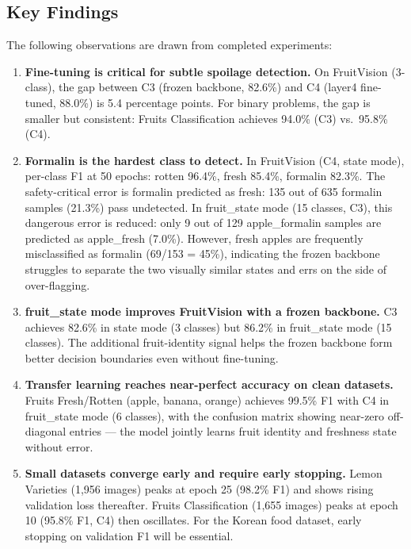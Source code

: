 \documentclass[12pt, a4paper]{article}
\begin{document}
\subsection{Key Findings}

The following observations are drawn from completed experiments:

\begin{enumerate}

\item \textbf{Fine-tuning is critical for subtle spoilage detection.}
On FruitVision (3-class), the gap between C3 (frozen backbone, 82.6\%)
and C4 (layer4 fine-tuned, 88.0\%) is 5.4 percentage points.
For binary problems, the gap is smaller but consistent:
Fruits Classification achieves 94.0\% (C3) vs.\ 95.8\% (C4).

\item \textbf{Formalin is the hardest class to detect.}
In FruitVision (C4, state mode), per-class F1 at 50 epochs:
rotten 96.4\%, fresh 85.4\%, formalin 82.3\%.
The safety-critical error is formalin predicted as fresh: 135 out of 635
formalin samples (21.3\%) pass undetected.
In fruit\_state mode (15 classes, C3), this dangerous error is reduced:
only 9 out of 129 apple\_formalin samples are predicted as apple\_fresh (7.0\%).
However, fresh apples are frequently misclassified as formalin (69/153 = 45\%),
indicating the frozen backbone struggles to separate the two visually similar
states and errs on the side of over-flagging.

\item \textbf{fruit\_state mode improves FruitVision with a frozen backbone.}
C3 achieves 82.6\% in state mode (3 classes) but 86.2\% in fruit\_state mode
(15 classes). The additional fruit-identity signal helps the frozen backbone
form better decision boundaries even without fine-tuning.

\item \textbf{Transfer learning reaches near-perfect accuracy on clean datasets.}
Fruits Fresh/Rotten (apple, banana, orange) achieves 99.5\% F1 with C4 in
fruit\_state mode (6 classes), with the confusion matrix showing near-zero
off-diagonal entries --- the model jointly learns fruit identity and freshness
state without error.

\item \textbf{Small datasets converge early and require early stopping.}
Lemon Varieties (1,956 images) peaks at epoch 25 (98.2\% F1) and shows
rising validation loss thereafter.
Fruits Classification (1,655 images) peaks at epoch 10 (95.8\% F1, C4) then
oscillates.
For the Korean food dataset, early stopping on validation F1 will be essential.

\end{enumerate}
\end{document}
